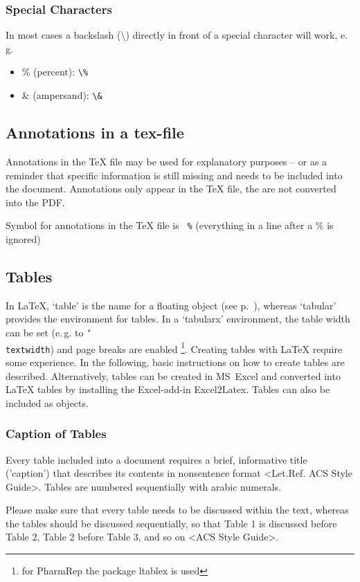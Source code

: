 \documentclass{pharmrep}
\newcommand{\PharmRep}{\textsf{PharmRep}\xspace}
\DeclareRobustCommand\cs[1]{\texttt{\char`\\#1}}
\newcommand{\pkg}[1]{\textsf{#1}}
\newcommand{\eg}{e.\,g.\xspace}
\begin{document}
\subsubsection{Special Characters}
In most cases a backslash (\textbackslash) directly in front of a special character will work, \eg
\begin{itemize}
   \item \% (percent): \verb|\%|
   \item \& (ampersand): \verb|\&|
\end{itemize}

\subsection{Annotations in a tex-file}
Annotations in the TeX{} file may be used for explanatory purposes -- or as a reminder that specific
information is still missing and needs to be included into the document.
Annotations only appear in the \TeX{} file, the are not converted into the PDF.

Symbol for annotations in the \TeX{} file is \verb| %| (everything in a line after a \% is ignored)

\subsection{Tables}
In \LaTeX{}, `table' is the name for a floating object (see p.~\pageref{subsubsec:TableFloating}), whereas
`tabular' provides the environment for tables. In a `tabularx' environment, the table width can be set (\eg
to \cs{textwidth}) and page breaks are enabled \footnote{for \PharmRep the package \pkg{ltablex} is used}.
Creating tables with \LaTeX{} require some experience. In the following, basic instructions on how to create
tables are described. Alternatively, tables can be created in MS~Excel and converted into \LaTeX{} tables by
installing the Excel-add-in Excel2Latex. Tables can also be included as objects.

\subsubsection{Caption of Tables}
Every table included into a document requires a brief, informative title ('caption') that describes its
contents in nonsentence format <Let.Ref. ACS Style Guide>.  Tables are numbered sequentially with
arabic numerals.

Please make sure that every table needs to be discussed within the text, whereas the tables should be
discussed sequentially, so that Table 1 is discussed before Table 2, Table 2 before Table 3, and so on
<ACS Style Guide>.
\end{document}

